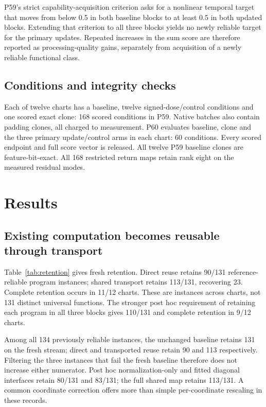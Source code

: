 \documentclass[11pt]{article}
\begin{document}
P59's strict capability-acquisition criterion asks for a nonlinear temporal target that moves from below 0.5 in both baseline blocks to at least 0.5 in both updated blocks. Extending that criterion to all three blocks yields no newly reliable target for the primary updates. Repeated increases in the sum score are therefore reported as processing-quality gains, separately from acquisition of a newly reliable functional class.

\subsection{Conditions and integrity checks}
Each of twelve charts has a baseline, twelve signed-dose/control conditions and one scored exact clone: 168 scored conditions in P59. Native batches also contain padding clones, all charged to measurement. P60 evaluates baseline, clone and the three primary update/control arms in each chart: 60 conditions. Every scored endpoint and full score vector is released. All twelve P59 baseline clones are feature-bit-exact. All 168 restricted return maps retain rank eight on the measured residual modes.

\section{Results}
\subsection{Existing computation becomes reusable through transport}
Table~\ref{tab:retention} gives fresh retention. Direct reuse retains 90/131 reference-reliable program instances; shared transport retains 113/131, recovering 23. Complete retention occurs in 11/12 charts. These are instances across charts, not 131 distinct universal functions. The stronger post hoc requirement of retaining each program in all three blocks gives 110/131 and complete retention in 9/12 charts.

\begin{table}[ht]\centering

\caption{Primary acquired updates, fresh-stream retention of unchanged programs. The denominator requires reliability of the unchanged baseline in all three blocks.}\label{tab:retention}
\end{table}

Among all 134 previously reliable instances, the unchanged baseline retains 131 on the fresh stream; direct and transported reuse retain 90 and 113 respectively. Filtering the three instances that fail the fresh baseline therefore does not increase either numerator. Post hoc normalization-only and fitted diagonal interfaces retain 80/131 and 83/131; the full shared map retains 113/131. A common coordinate correction offers more than simple per-coordinate rescaling in these records.
\end{document}
